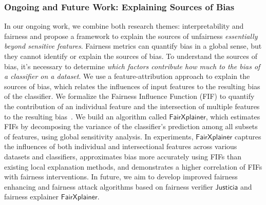 \documentclass{article}
\begin{document}
\subsubsection*{Ongoing and Future Work: Explaining Sources of Bias} In our ongoing work, we combine both research themes: interpretability and fairness and propose a framework to explain the sources of unfairness \textit{essentially beyond sensitive features}. Fairness metrics can quantify bias in a global sense, but they cannot identify or explain the sources of bias. To understand the sources of bias, it's necessary to determine \textit{which factors contribute how much to the bias of a classifier on a dataset}. We use a feature-attribution approach to explain the sources of bias, which relates the influences of input features to the resulting bias of the classifier. We formalize the Fairness Influence Function (FIF) to quantify the contribution of an individual feature and the intersection of multiple features to the resulting bias~\cite{ghosh2022how}. We build an algorithm called $\mathsf{FairXplainer}$, which estimates FIFs by decomposing the variance of the classifier's prediction among all subsets of features, using global sensitivity analysis. In experiments, $\mathsf{FairXplainer}$ captures the influences of both individual and intersectional features across various datasets and classifiers, approximates bias more accurately using FIFs than existing local explanation methods, and demonstrates a higher correlation of FIFs with fairness interventions. In future, we aim to develop improved fairness enhancing and fairness attack algorithms based on fairness verifier $ \mathsf{Justicia} $ and fairness explainer $ \mathsf{FairXplainer} $. 






\end{document}

